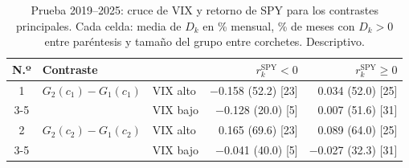 \begin{table}[h]
\centering
\footnotesize
\setlength{\tabcolsep}{4pt}
\caption{Prueba 2019--2025: cruce de VIX y retorno de SPY para los contrastes principales. Cada celda: media de $D_k$ en \% mensual, \% de meses con $D_k>0$ entre paréntesis y tamaño del grupo entre corchetes. Descriptivo.}\label{tab:r4_cruce}
\begin{tabular}{|c|l|l|r|r|}
\hline
\textbf{N.º} & \textbf{Contraste} & & \textbf{$r^{\mathrm{SPY}}_k<0$} & \textbf{$r^{\mathrm{SPY}}_k\ge 0$} \\ \hline
1 & $G_2(c_1)-G_1(c_1)$ & VIX alto & $-$0.158 (52.2) [23] & 0.034 (52.0) [25] \\ \cline{3-5}
 & & VIX bajo & $-$0.128 (20.0) [5] & 0.007 (51.6) [31] \\ \hline
2 & $G_2(c_2)-G_1(c_2)$ & VIX alto & 0.165 (69.6) [23] & 0.089 (64.0) [25] \\ \cline{3-5}
 & & VIX bajo & $-$0.041 (40.0) [5] & $-$0.027 (32.3) [31] \\ \hline
\end{tabular}
\end{table}
